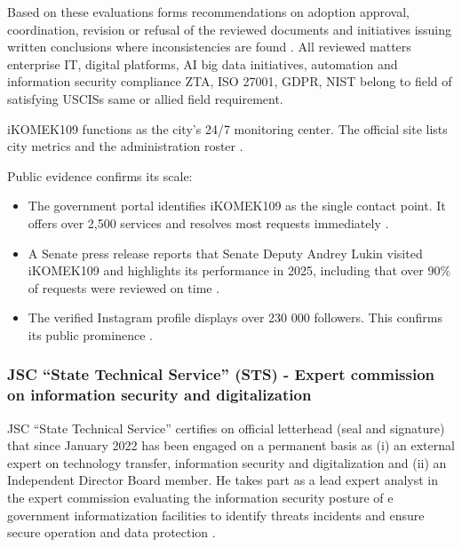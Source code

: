 Based on these evaluations \mrl{} forms recommendations on adoption approval, coordination, revision or refusal of the reviewed documents and initiatives issuing written conclusions where inconsistencies are found . All reviewed matters enterprise IT, digital platforms, AI big data initiatives, automation and information security compliance ZTA, ISO 27001, GDPR, NIST belong to \mrls field of \fie{} satisfying USCISs same or allied field requirement.

iKOMEK109 functions as the city’s 24/7 monitoring center. The official site lists city metrics and the administration roster .

Public evidence confirms its scale:
\vspace{-0.5\baselineskip}
\begin{itemize}[nosep]
\item The government portal identifies iKOMEK109 as the single contact point. It offers over 2,500 services and resolves most requests immediately .
\item A Senate press release reports that Senate Deputy Andrey Lukin visited iKOMEK109 and highlights its performance in 2025, including that over 90\% of requests were reviewed on time .
\item The verified Instagram profile displays over 230 000 followers. This confirms its public prominence .
\end{itemize}


\subsubsection{JSC ``State Technical Service'' (STS) - Expert commission on information security and digitalization}

\label{subsubsec:JudgingSTS}

JSC ``State Technical Service'' certifies on official letterhead (seal and signature) that since January 2022 \mrl{} has been engaged on a permanent basis as (i) an external expert on technology transfer, information security and digitalization and (ii) an Independent Director Board member. He takes part as a lead expert analyst in the expert commission evaluating the information security posture of e government informatization facilities to identify threats incidents and ensure secure operation and data protection .


